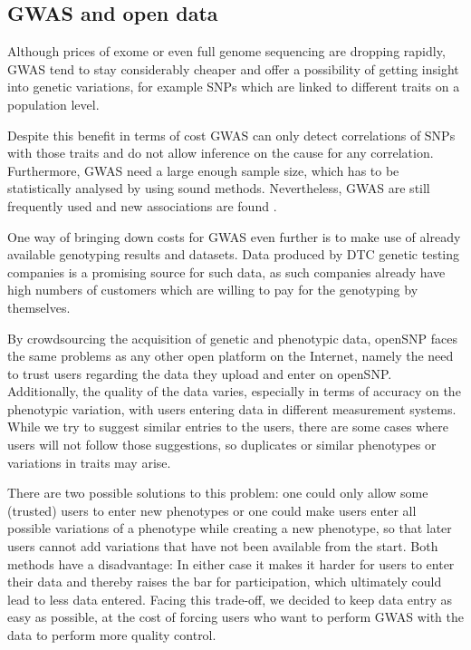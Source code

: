 \documentclass[10pt]{article}
\begin{document}
\subsection*{GWAS and open data}
Although prices of exome or even full genome sequencing are dropping rapidly, GWAS tend to stay considerably cheaper 
and offer a possibility of getting insight into genetic variations, for example SNPs which are linked to different traits 
on a population level. 

Despite this benefit in terms of cost GWAS can only detect correlations of SNPs with those traits and do not allow 
inference on the cause for any correlation. Furthermore, GWAS need a large enough sample size, 
which has to be statistically analysed by using sound methods. 
Nevertheless, GWAS are still frequently used and new associations are found \cite{10.1371.journal.pone.0031470,10.1371.journal.pone.0030309,10.1371.journal.pone.0029848}. 

One way of bringing down costs for GWAS even further is to make use of already available genotyping results and datasets. 
Data produced by DTC genetic testing companies is a promising source for such data, as such companies already have high 
numbers of customers which are willing to pay for the genotyping by themselves.

By crowdsourcing the acquisition of genetic and phenotypic data, openSNP faces the same problems as any other 
open platform on the Internet, namely the need to trust users regarding the data they upload and enter on openSNP. 
Additionally, the quality of the data varies, especially in terms of accuracy on the phenotypic variation, 
with users entering data in different measurement systems. While we try to suggest similar entries to the users, 
there are some cases where users will not follow those suggestions, so duplicates or similar phenotypes or variations in traits may arise. 

There are two possible solutions to this problem: one could only allow some (trusted) users to enter new phenotypes or one 
could make users enter all possible variations of a phenotype while creating a new phenotype, so that later users cannot add 
variations that have not been available from the start. Both methods have a disadvantage: In either case it makes it harder 
for users to enter their data and thereby raises the bar for participation, which ultimately could lead to less data entered. 
Facing this trade-off, we decided to keep data entry as easy as possible, at the cost of forcing users who want to perform GWAS 
with the data to perform more quality control.
\end{document}
